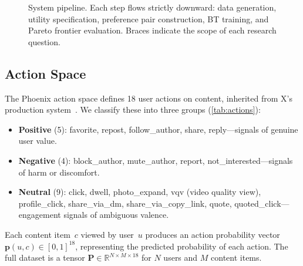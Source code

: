 \documentclass[11pt,letterpaper]{article}
\begin{document}
\begin{figure}[t]
\caption{System pipeline. Each step flows strictly downward: data
  generation, utility specification, preference pair construction,
  BT training, and Pareto frontier evaluation. Braces indicate the
  scope of each research question.}
\label{fig:pipeline}
\end{figure}

\subsection{Action Space}

The Phoenix action space defines 18 user actions on content, inherited
from X's production system~\cite{xalgorithm2023}. We classify these
into three groups (\cref{tab:actions}):

\begin{itemize}
  \item \textbf{Positive} (5): favorite, repost, follow\_author,
    share, reply---signals of genuine user value.
  \item \textbf{Negative} (4): block\_author, mute\_author, report,
    not\_interested---signals of harm or discomfort.
  \item \textbf{Neutral} (9): click, dwell, photo\_expand, vqv
    (video quality view), profile\_click, share\_via\_dm,
    share\_via\_copy\_link, quote, quoted\_click---engagement signals
    of ambiguous valence.
\end{itemize}

Each content item~$c$ viewed by user~$u$ produces an action
probability vector $\mathbf{p}(u, c) \in [0,1]^{18}$, representing
the predicted probability of each action. The full dataset is a
tensor $\mathbf{P} \in \mathbb{R}^{N \times M \times 18}$ for $N$
users and $M$ content items.
\end{document}
